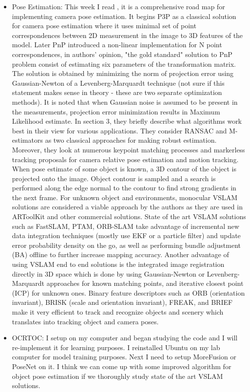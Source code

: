 \documentclass[11pt]{article}
\begin{document}
\begin{itemize}
	\item Pose Estimation: This week I read \cite{marchand2015pose}, it is a comprehensive road map for implementing camera pose estimation. It begins P3P as a classical solution for camera pose estimation where it uses minimal set of point correspondences between 2D measurement in the image to 3D features of the model. Later PnP introduced a non-linear implementation for N point correspondences, in authors' opinion, "the gold standard" solution to PnP problem consist of estimating six parameters of the transformation matrix. The solution is obtained by minimizing the norm of projection error using Gaussian-Newton of a Levenberg-Marquardt technique (not sure if this statement makes sense in theory - these are two separate optimization methods). It is noted that when Gaussian noise is assumed to be present in the measurements, projection error minimization results in Maximum Likelihood estimate. In section 3, they briefly describe what algorithms work best in their view for various applications. They consider RANSAC and M-estimators as two classical approaches for making robust estimation. Moreover, they look at numerous keypoint matching processes and markerless tracking proposals for camera relative pose estimation and motion tracking. When pose estimate of some object is known, a 3D contour of the object is projected onto the image. Object contour is sampled and a search is performed along the edge normal to the contour to find strong gradients in the next frame. For unknown object and environments, monocular VSLAM solutions are considered a viable approach by the authors as they are used in ARToolKit and other commercial solutions. State of the art VSLAM solutions such as FastSLAM, PTAM, ORB-SLAM take advantage of incremental new data integration techniques (mostly use EKF or a particle filter) and update error probability density on the go, as well as performing bundle adjustment (BA) offline to further increase mapping accuracy. Another advantage of using VSLAM end to end solutions is the integrated image registration directly in 3D space which is done by using Gaussian-Newton or Levenberg-Marquardt approaches for known matching points, and iterative closest point (ICP) for unknown ones. Binary feature descriptors such as ORB (orientation invariant), BRISK (scale and orientation invariant), FREAK, and BRIEF make it very efficient to track and recognize objects and scenery which translates into tracking object and camera poses.



	\item OCRTOC: I setup \cite{MoreFusion} on my computer and began studying the code and I will re-implement it for learning purposes. I reinstalled Ubuntu on my lab computer for model training purposes. Next I need to setup MoreFusion or PoseNet on it. I think we can come up with some improved algorithm for object pose estimation if we thoroughly study state of the art VSLAM solutions. 


\end{itemize}
\end{document}
